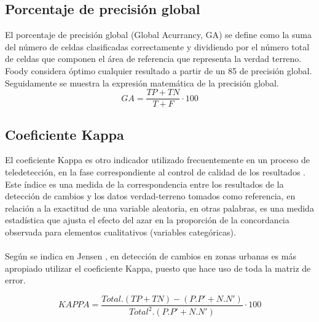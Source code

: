 \subsection{Porcentaje de precisi\'on global}\label{sec:pg}
El porcentaje de precisi\'on global (Global Acurrancy, GA) se define como la suma del n\'umero de celdas clasificadas correctamente y dividiendo por el n\'umero total de celdas que componen el \'area de referencia que representa la verdad terreno. Foody \cite{foody2002status} considera \'optimo cualquier resultado a partir de un 85 de precisión global. Seguidamente se muestra la expresi\'on matem\'atica de la precisi\'on global.
		\begin{equation}
		GA = \frac{TP+TN}{T+F}\cdot100
		\end{equation}
\subsection{Coeficiente Kappa}\label{sec:kappa}
El coeficiente Kappa es otro indicador utilizado frecuentemente en un proceso de teledetecci\'on, en la fase correspondiente al control de calidad de los resultados \cite{chuvieco1998factor}. Este \'indice es una medida de la correspondencia entre los resultados de la detecci\'on de cambios y los datos verdad-terreno tomados como referencia, en relaci\'on a la exactitud de una variable aleatoria, en otras palabras, es una medida estad\'istica que ajusta el efecto del azar en la proporci\'on de la concordancia observada para elementos cualitativos (variables categ\'oricas).\\~\\
Seg\'un se indica en Jensen \cite{jensen1981urban}, en detecci\'on de cambios en zonas urbanas es m\'as apropiado utilizar el coeficiente Kappa, puesto que hace uso de toda la matriz de error.

		\begin{equation}
		KAPPA=\dfrac{Total.(TP+TN)-(P.P'+N.N')}{Total^{2}.(P.P'+N.N')}\cdot100
		\end{equation}
		
